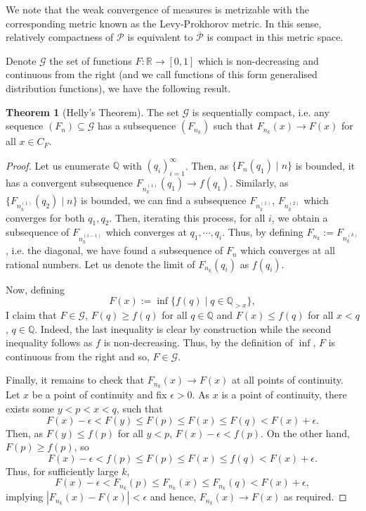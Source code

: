 \documentclass[]{article}
\theoremstyle{definition}
\newtheorem{theorem}{Theorem}
\theoremstyle{definition}
\begin{document}
We note that the weak convergence of measures is metrizable with the corresponding 
metric known as the Levy-Prokhorov metric. In this sense, relatively compactness 
of \(\mathcal{P}\) is equivalent to \(\overline{\mathcal{P}}\) is compact in 
this metric space.

Denote \(\mathcal{G}\) the set of functions \(F : \mathbb{R} \to [0, 1]\) which 
is non-decreasing and continuous from the right (and we call functions of 
this form generalised distribution functions), we have the following result.

\begin{theorem}[Helly's Theorem]
  The set \(\mathcal{G}\) is sequentially compact, i.e. any sequence 
  \((F_n) \subseteq \mathcal{G}\) has a subsequence \((F_{n_k})\) such that 
  \(F_{n_k}(x) \to F(x)\) for all \(x \in C_F\).
\end{theorem}
\begin{proof}
  Let us enumerate \(\mathbb{Q}\) with \((q_i)_{i = 1}^\infty\). Then, as 
  \(\{F_n(q_1) \mid n\}\) is bounded, it has a convergent subsequence 
  \(F_{n_k^{(1)}}(q_1) \to f(q_1)\). Similarly, as \(\{F_{n_k^{(1)}}(q_2) \mid n\}\) 
  is bounded, we can find a subsequence \(F_{n_k^{(1)}}\), \(F_{n_k^{(2)}}\) 
  which converges for both \(q_1, q_2\). Then, iterating this process, for all 
  \(i\), we obtain a subsequence of \(F_{n_k^{(i - 1)}}\) which converges 
  at \(q_1, \cdots, q_i\). Thus, by defining \(F_{n_k} := F_{n_k^{(k)}}\), 
  i.e. the diagonal, we have found a subsequence of \(F_n\) which converges 
  at all rational numbers. Let us denote the limit of \(F_{n_k}(q_i)\) as \(f(q_i)\).

  Now, defining 
  \[F(x) := \inf \{f(q) \mid q \in \mathbb{Q}_{> x}\},\]
  I claim that \(F \in \mathcal{G}\), \(F(q) \ge f(q)\) for all \(q \in \mathbb{Q}\)
  and \(F(x) \le f(q)\) for all \(x < q\), \(q \in \mathbb{Q}\). Indeed, 
  the last inequality is clear by construction while the second inequality 
  follows as \(f\) is non-decreasing. Thus, by the definition of \(\inf\), 
  \(F\) is continuous from the right and so, \(F \in \mathcal{G}\).

  Finally, it remains to check that \(F_{n_k}(x) \to F(x)\) at all points of 
  continuity. Let \(x\) be a point of continuity and fix \(\epsilon > 0\). As 
  \(x\) is a point of continuity, there exists some \(y < p < x < q\), such that 
  \[F(x) - \epsilon < F(y) \le F(p) \le F(x) \le F(q) < F(x) + \epsilon.\] 
  Then, as \(F(y) \le f(p)\) for all \(y < p\), \(F(x) - \epsilon < f(p)\). 
  On the other hand, \(F(p) \ge f(p)\), so 
  \[F(x) - \epsilon < f(p) \le F(p) \le F(x) \le f(q) < F(x) + \epsilon.\]
  Thus, for sufficiently large \(k\), 
  \[F(x) - \epsilon < F_{n_k}(p) \le F_{n_k}(x) \le F_{n_k}(q) < F(x) + \epsilon,\]
  implying \(|F_{n_k}(x) - F(x)| < \epsilon\) and hence, 
  \(F_{n_k}(x) \to F(x)\) as required.
\end{proof}
\end{document}
